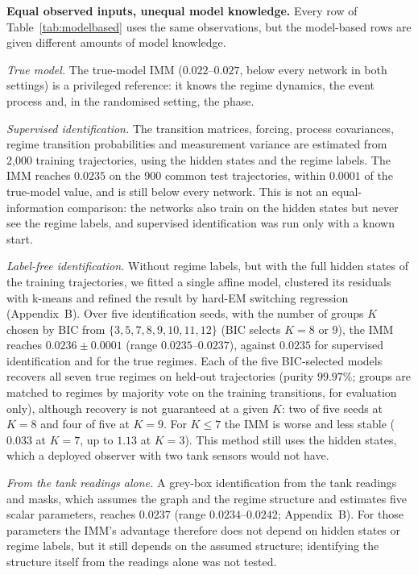 \documentclass[conference]{IEEEtran}
\begin{document}
\textbf{Equal observed inputs, unequal model knowledge.} Every row of Table~\ref{tab:modelbased} uses the same observations, but the model-based rows are given different amounts of model knowledge.

\emph{True model.} The true-model IMM ($0.022$--$0.027$, below every network in both settings) is a privileged reference: it knows the regime dynamics, the event process and, in the randomised setting, the phase.

\emph{Supervised identification.} The transition matrices, forcing, process covariances, regime transition probabilities and measurement variance are estimated from 2,000 training trajectories, using the hidden states and the regime labels. The IMM reaches $0.0235$ on the 900 common test trajectories, within $0.0001$ of the true-model value, and is still below every network. This is not an equal-information comparison: the networks also train on the hidden states but never see the regime labels, and supervised identification was run only with a known start.

\emph{Label-free identification.} Without regime labels, but with the full hidden states of the training trajectories, we fitted a single affine model, clustered its residuals with k-means and refined the result by hard-EM switching regression (Appendix~B). Over five identification seeds, with the number of groups $K$ chosen by BIC from $\{3,5,7,8,9,10,11,12\}$ (BIC selects $K=8$ or $9$), the IMM reaches $0.0236\pm0.0001$ (range $0.0235$--$0.0237$), against $0.0235$ for supervised identification and for the true regimes. Each of the five BIC-selected models recovers all seven true regimes on held-out trajectories (purity $99.97\%$; groups are matched to regimes by majority vote on the training transitions, for evaluation only), although recovery is not guaranteed at a given $K$: two of five seeds at $K=8$ and four of five at $K=9$. For $K\le7$ the IMM is worse and less stable ($0.033$ at $K=7$, up to $1.13$ at $K=3$). This method still uses the hidden states, which a deployed observer with two tank sensors would not have.

\emph{From the tank readings alone.} A grey-box identification from the tank readings and masks, which assumes the graph and the regime structure and estimates five scalar parameters, reaches $0.0237$ (range $0.0234$--$0.0242$; Appendix~B). For those parameters the IMM's advantage therefore does not depend on hidden states or regime labels, but it still depends on the assumed structure; identifying the structure itself from the readings alone was not tested.
\end{document}
